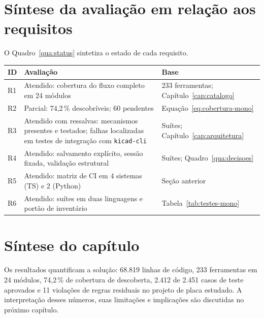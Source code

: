\section{Síntese da avaliação em relação aos requisitos}

O Quadro~\ref{qua:status} sintetiza o estado de cada requisito.

\begin{quadro}[htbp]
\centering
\small
\caption{Síntese de atendimento aos requisitos.}
\label{qua:status}
\begin{tabular}{@{}p{0.7cm}p{7.2cm}p{6.6cm}@{}}
\toprule
\textbf{ID} & \textbf{Avaliação} & \textbf{Base} \\
\midrule
R1 & Atendido: cobertura do fluxo completo em 24 módulos & 233 ferramentas; Capítulo~\ref{cap:catalogo} \\
R2 & Parcial: 74,2\,\% descobríveis; 60 pendentes & Equação~\ref{eq:cobertura-mono} \\
R3 & Atendido com ressalvas: mecanismos presentes e testados; falhas localizadas em testes de integração com \texttt{kicad-cli} & Suítes; Capítulo~\ref{cap:arquitetura} \\
R4 & Atendido: salvamento explícito, sessão fixada, validação estrutural & Suítes; Quadro~\ref{qua:decisoes} \\
R5 & Atendido: matriz de CI em 4 sistemas (TS) e 2 (Python) & Seção anterior \\
R6 & Atendido: suítes em duas linguagens e portão de inventário & Tabela~\ref{tab:testes-mono} \\
\bottomrule
\end{tabular}
\end{quadro}

\section{Síntese do capítulo}

Os resultados quantificam a solução: 68.819 linhas de código, 233 ferramentas
em 24 módulos, 74,2\,\% de cobertura de descoberta, 2.412 de 2.451 casos de
teste aprovados e 11 violações de regras residuais no projeto de placa
estudado. A interpretação desses números, suas limitações e implicações são
discutidas no próximo capítulo.

